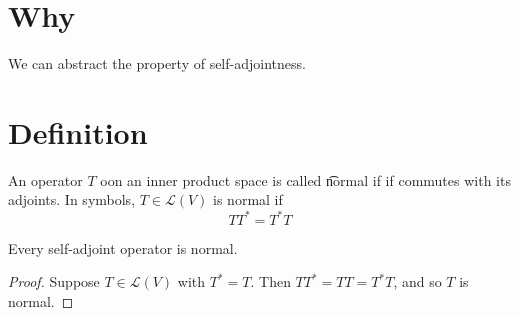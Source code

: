 
\section*{Why}

We can abstract the property of self-adjointness.

\section*{Definition}

An operator $T$ oon an inner product space is called \t{normal} if if commutes with its adjoints.
In symbols, $T \in \mathcal{L} (V)$ is normal if
\[
TT^* = T^* T
\]

\begin{proposition}
Every self-adjoint operator is normal.
\end{proposition}

\begin{proof}Suppose $T \in \mathcal{L} (V)$ with $T^* = T$.
Then $TT^* = TT = T^*T$, and so $T$ is normal.\end{proof}
\blankpage